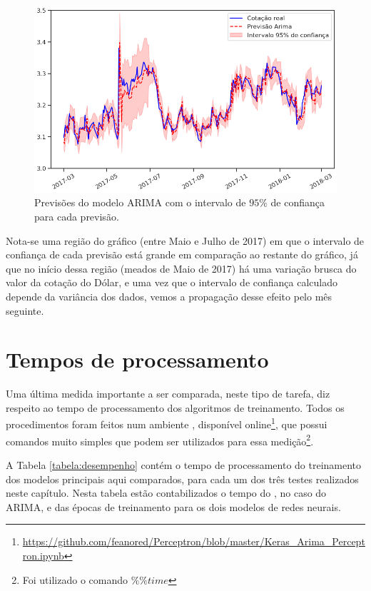 \begin{figure}[htb]
\centering
\includegraphics[width=14cm]{figuras/series_arima_ano}
\caption{Previsões do modelo ARIMA com o intervalo de $95\%$ de confiança para cada previsão.}
\label{fig:series_arima_ano}
\end{figure}

Nota-se uma região do gráfico (entre Maio e Julho de 2017) em que o intervalo de confiança de cada previsão está grande em comparação ao restante do gráfico, já que no início dessa região (meados de Maio de 2017) há uma variação brusca do valor da cotação do Dólar, e uma vez que o intervalo de confiança calculado depende da variância dos dados, vemos a propagação desse efeito pelo mês seguinte.

\section{Tempos de processamento}

Uma última medida importante a ser comparada, neste tipo de tarefa, diz respeito ao tempo de processamento dos algoritmos de treinamento. Todos os procedimentos foram feitos num ambiente , disponível online\footnote{\url{https://github.com/feanored/Perceptron/blob/master/Keras_Arima_Perceptron.ipynb}}, que possui comandos muito simples que podem ser utilizados para essa medição\footnote{Foi utilizado o comando $\%\%time$}.

A Tabela \ref{tabela:desempenho} contém o tempo de processamento do treinamento dos modelos principais aqui comparados, para cada um dos três testes realizados neste capítulo. Nesta tabela estão contabilizados o tempo do , no caso do ARIMA, e das épocas de treinamento para os dois modelos de redes neurais.

